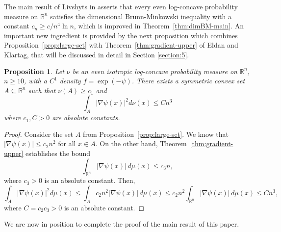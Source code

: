 \documentclass[11pt,leqno]{article}
\newtheorem{proposition}[theorem]{Proposition}
\theoremstyle{definition}
\theoremstyle{remark}
\numberwithin{equation}{section}
\newcommand{\ls}{\leqslant}
\newcommand{\gr}{\geqslant}
\newcommand{\1}{\textbf{1}}
\begin{document}
The main result of Livshyts in \cite{Livshyts-2023} asserts that every even log-concave probability measure on $\mathbb{R}^n$ satisfies the
dimensional Brunn-Minkowski inequality with a constant $c_n\gr c/n^4\ln n$, which is improved in Theorem~\ref{thm:dimBM-main}.
An important new ingredient is provided by the next proposition which combines Proposition~\ref{prop:large-set} with Theorem~\ref{thm:gradient-upper} of Eldan and Klartag, that will be discussed in detail in Section \ref{section:5}.

\begin{proposition}\label{prop:large-set-3}Let $\nu$ be an even isotropic log-concave probability measure on $\mathbb{R}^n$, $n\gr 10$, with
a $C^1$ density $f=\exp(-\psi)$. There exists a symmetric convex set $A\subseteq\mathbb{R}^n$ such that $\nu(A)\gr c_1$ and
$$\int_A|\nabla\psi(x)|^2d\nu(x)\ls Cn^3$$
where $c_1,C>0$ are absolute constants.
\end{proposition}

\begin{proof}Consider the set $A$ from Proposition~\ref{prop:large-set}. We know that $|\nabla\psi(x)|\ls c_2n^2$ for all $x\in A$.
On the other hand, Theorem~\ref{thm:gradient-upper} establishes the bound
$$\int_{\mathbb{R}^n} |\nabla \psi(x)|\, d\mu(x) \ls c_3n,$$
where $c_3>0$ is an absolute constant. Then,
$$\int_A|\nabla\psi(x)|^2d\mu(x)\ls \int_Ac_2n^2|\nabla\psi(x)|\,d\mu(x)\ls c_2n^2\int_{\mathbb{R}^n}|\nabla\psi(x)|\,d\mu(x)\ls Cn^3,$$
where $C=c_2c_3>0$ is an absolute constant.
\end{proof}


We are now in position to complete the proof of the main result of this paper.
\end{document}
